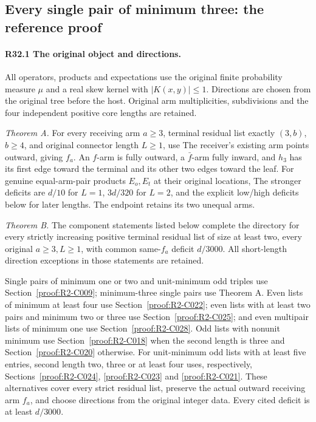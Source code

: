 \subsection{Every single pair of minimum three: the reference proof}\label{proof:R2-C032}
\paragraph{R32.1 The original object and directions.}
All operators, products and expectations use the original finite probability
measure \(\mu\) and a real skew kernel with \(|K(x,\allowbreak y)|\le1\). Directions
are chosen from the original tree before the host. Original arm
multiplicities, subdivisions and the four independent positive core lengths
are retained.

\emph{Theorem A.} For every receiving arm \(a\ge3\), terminal residual
list exactly \((3,\allowbreak b)\), \(b\ge4\), and original connector length \(L\ge1\), use
The receiver's existing arm points outward, giving \(f_a\). An \(f\)-arm
is fully outward, a \(\bar f\)-arm fully inward, and \(h_3\) has its first
edge toward the terminal and its other two edges toward the leaf. For
genuine equal-arm-pair products \(E_o,\allowbreak E_t\) at their original locations,
The stronger deficits are \(d/10\) for \(L=1\), \(3d/320\) for \(L=2\),
and the explicit low/high deficits below for later lengths. The endpoint retains its two unequal arms.

\emph{Theorem B.} The component statements listed below complete the
directory for every strictly increasing positive terminal residual list
of size at least two, every original \(a\ge3,\allowbreak L\ge1\), with
common same-\(f_a\) deficit \(d/3000\). All short-length direction
exceptions in those statements are retained.

Single pairs of minimum one or two and unit-minimum odd triples use
Section~\ref{proof:R2-C009}; minimum-three single pairs use Theorem A.
Even lists of minimum at least four use Section~\ref{proof:R2-C022};
even lists with at least two pairs and minimum two or three use
Section~\ref{proof:R2-C025}; and even multipair lists of minimum one
use Section~\ref{proof:R2-C028}.
Odd lists with nonunit minimum use Section~\ref{proof:R2-C018} when
the second length is three and Section~\ref{proof:R2-C020} otherwise.
For unit-minimum odd lists with at least five entries, second length
two, three or at least four uses, respectively,
Sections~\ref{proof:R2-C024}, \ref{proof:R2-C023} and
\ref{proof:R2-C021}. These alternatives cover every strict residual
list, preserve the actual outward receiving arm \(f_a\), and choose
directions from the original integer data. Every cited deficit is at
least \(d/3000\).


